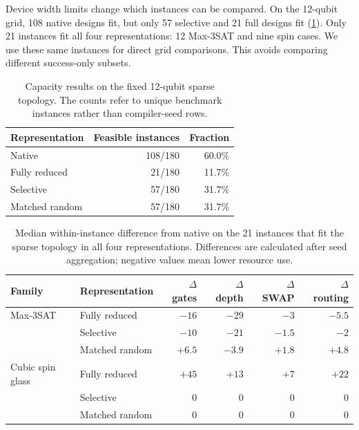 \documentclass[a4paper,onecolumn,11pt,unpublished]{quantumarticle}
\theoremstyle{remark}
\begin{document}
Device width limits change which instances can be compared.
On the 12-qubit grid, 108 native designs fit, but only 57 selective and
21 full designs fit (\cref{tab:e2-sparse-capacity}).
Only 21 instances fit all four representations: 12 Max-3SAT and nine spin
cases. We use these same instances for direct grid comparisons.
This avoids comparing different success-only subsets.

\begin{table}[!htbp]
    \centering
    \small
    \caption{Capacity results on the fixed 12-qubit sparse topology.  The
    counts refer to unique benchmark instances rather than compiler-seed
    rows.}
    \label{tab:e2-sparse-capacity}
    \begin{tabular}{@{}lrr@{}}
        \toprule
        Representation & Feasible instances & Fraction\\
        \midrule
        Native          & 108/180 & 60.0\%\\
        Fully reduced   & 21/180  & 11.7\%\\
        Selective       & 57/180  & 31.7\%\\
        Matched random  & 57/180  & 31.7\%\\
        \bottomrule
    \end{tabular}
\end{table}

\begin{table}[!htbp]
    \centering
    \small
    \caption{Median within-instance difference from native on the 21 instances
    that fit the sparse topology in all four representations.  Differences are
    calculated after seed aggregation; negative values mean lower resource
    use.}
    \label{tab:e2-sparse-common-paired}
    \begin{tabular}{@{}llrrrr@{}}
        \toprule
        Family & Representation
        & $\Delta$ gates & $\Delta$ depth & $\Delta$ SWAP & $\Delta$ routing\\
        \midrule
        Max-3SAT & Fully reduced  & $-16$ & $-29$ & $-3$   & $-5.5$\\
                 & Selective      & $-10$ & $-21$ & $-1.5$ & $-2$\\
                 & Matched random & $+6.5$ & $-3.9$ & $+1.8$ & $+4.8$\\
        \addlinespace
        Cubic spin glass & Fully reduced  & $+45$ & $+13$ & $+7$ & $+22$\\
                         & Selective      & $0$   & $0$   & $0$  & $0$\\
                         & Matched random & $0$   & $0$   & $0$  & $0$\\
        \bottomrule
    \end{tabular}

\end{table}
\end{document}
